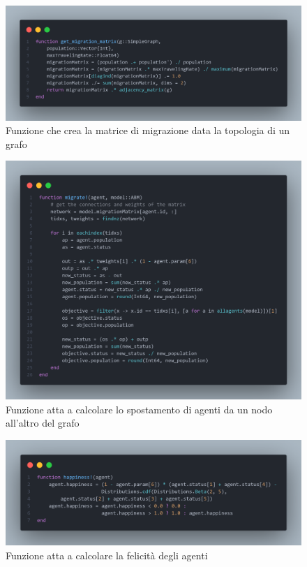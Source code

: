 \begin{figure}[H]
    \begin{center}
		\includegraphics[width=\textwidth]{img/mmfunc.png}
		\caption{Funzione che crea la matrice di migrazione data la topologia di un grafo}
		\label{fig:migration_matrix_function}
	\end{center}
\end{figure}

\begin{figure}[H]
    \begin{center}
		\includegraphics[width=\textwidth]{img/migratef.png}
		\caption{Funzione atta a calcolare lo spostamento di agenti da un nodo all'altro del grafo}
		\label{fig:migrationf}
	\end{center}
\end{figure}

\begin{figure}[H]
    \begin{center}
		\includegraphics[width=\textwidth]{img/happiness.png}
		\caption{Funzione atta a calcolare la felicità degli agenti}
		\label{fig:happinessf}
	\end{center}
\end{figure}

